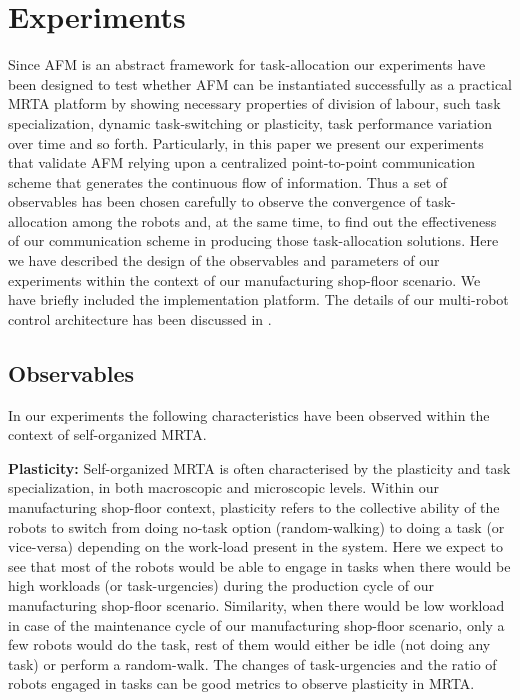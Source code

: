 \documentclass[smallcondensed]{svjour3}
\begin{document}
\section{Experiments}
\label{sec:expt}
Since AFM is an abstract framework for task-allocation our experiments have been designed to test whether AFM can be instantiated successfully as a practical MRTA platform by showing necessary properties of division of labour, such task specialization, dynamic task-switching or plasticity,  task performance variation over time and so forth. Particularly, in this paper we present our experiments that validate AFM relying upon a centralized point-to-point communication scheme that generates the continuous flow of information. Thus a set of observables has been chosen carefully to observe the convergence of  task-allocation among the robots and, at the same time, to find out the effectiveness of our communication scheme in producing those task-allocation solutions. Here we have described the design of the observables and parameters of our experiments within the context of our manufacturing shop-floor scenario.  We have briefly included the implementation platform. The details of our multi-robot control architecture has been discussed in \cite{Sarker2010control}.
\subsection{Observables}
In our experiments the following characteristics have been observed within the context of self-organized MRTA.

\textbf{Plasticity:} %
Self-organized MRTA is often characterised by the plasticity and task specialization, in both macroscopic and microscopic levels. Within our manufacturing shop-floor context, plasticity refers to the collective ability of the robots to switch from doing no-task option (random-walking) to doing a task (or vice-versa) depending on the work-load present in the system. Here we expect to see that most of the robots would be able to engage in tasks when there would be high workloads (or task-urgencies) during the production cycle of our manufacturing shop-floor scenario. Similarity, when there would be low workload in case of the maintenance cycle of our manufacturing shop-floor scenario, only a few robots would do the task, rest of them would either be idle (not doing any task) or perform a random-walk.  The changes of task-urgencies and the ratio of robots engaged in tasks can be good metrics to observe plasticity in MRTA.
\end{document}
